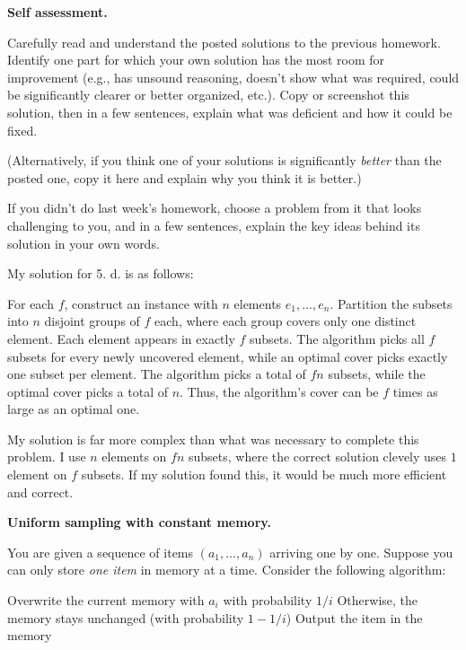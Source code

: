 \documentclass[11pt,addpoints,answers]{exam}
\begin{document}
\begin{questions}

  \question[10] \textbf{Self assessment.} \nopagebreak
  
  Carefully read and understand the posted solutions to the previous homework.
  Identify one part for which your own solution has the most room for improvement (e.g., has unsound reasoning, doesn’t show what was required, could be significantly clearer or better organized, etc.).
  Copy or screenshot this solution, then in a few sentences, explain what was deficient and how it could be fixed.

  (Alternatively, if you think one of your solutions is significantly \emph{better} than the posted one, copy it here and explain why you think it is better.)

  If you didn't do last week's homework, choose a problem from it that looks challenging to you, and in a few sentences, explain the key ideas behind its solution in your own words.

  \begin{solution} 
  My solution for 5. d. is as follows:
  \begin{solution}
    For each \(f\), construct an instance with \(n\) elements \(e_1,\dots,e_n\). Partition the subsets into \(n\) disjoint groups of \(f\) each, where each group covers only one distinct element. Each element appears in exactly \(f\) subsets. The algorithm picks all \(f\) subsets for every newly uncovered element, while an optimal cover picks exactly one subset per element. The algorithm picks a total of \(fn\) subsets, while the optimal cover picks a total of \(n\). Thus, the algorithm's cover can be $f$ times as large as an optimal one.
  \end{solution}
  My solution is far more complex than what was necessary to complete this problem. I use $n$ elements on $fn$ subsets, where the correct solution clevely uses $1$ element on $f$ subsets. If my solution found this, it would be much more efficient and correct.
  \end{solution}

\pagebreak
    \question [6] \textbf{Uniform sampling with constant memory.}

    You are given a sequence of items $(a_1, \ldots, a_n)$ arriving one by one. Suppose you can only store \emph{one item} in memory at a time. Consider the following algorithm:
    
    \begin{minipage}{\linewidth}
      \begin{algorithm}[H]
        \begin{algorithmic}[1]
            \State Overwrite the current memory with $a_i$ with probability $1/i$ 
            \State Otherwise, the memory stays unchanged (with probability $1 - 1/i$)
          \EndFor
          \State Output the item in the memory
          \EndFunction
        \end{algorithmic}    
      \end{algorithm}
    \end{minipage}


\end{questions}
\end{document}
